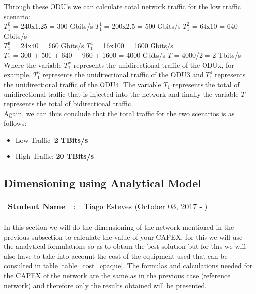 Through these ODU's we can calculate total network traffic for the low traffic scenario:\\

$T_1^0$ = 240x1.25 = 300 Gbits/s \qquad
$T_1^1$ = 200x2.5 = 500 Gbits/s \qquad
$T_1^2$ = 64x10 = 640 Gbits/s \\

$T_1^3$ = 24x40 = 960 Gbits/s \quad
$T_1^4$ = 16x100 = 1600 Gbits/s \\

$T_{1}$ = 300 + 500 + 640 + 960 + 1600 = 4000 Gbits/s \qquad
$T$ = 4000/2 = 2 Tbits/s\\

Where the variable $T_1^x$ represents the unidirectional traffic of the ODUx, for example, $T_1^3$ represents the unidirectional traffic of the ODU3 and $T_1^4$ represents the unidirectional traffic of the ODU4. The variable $T_{1}$ represents the total of unidirectional traffic that is injected into the network and finally the variable $T$ represents the total of bidirectional traffic.\\

Again, we can thus conclude that the total traffic for the two scenarios is as follows:
\begin{itemize}
  \item Low Traffic: \textbf{2 TBits/s}
  \item High Traffic: \textbf{20 TBits/s}
\end{itemize}


\subsection{Dimensioning using Analytical Model}
\begin{tcolorbox}	
\begin{tabular}{p{2.75cm} p{0.2cm} p{10.5cm}} 	
\textbf{Student Name}  &:& Tiago Esteves    (October 03, 2017 - )\\
\end{tabular}
\end{tcolorbox}

In this section we will do the dimensioning of the network mentioned in the previous subsection to calculate the value of your CAPEX, for this we will use the analytical formulations so as to obtain the best solution but for this we will also have to take into account the cost of the equipment used that can be consulted in table \ref{table_cost_opaque}.
The formulas and calculations needed for the CAPEX of the network are the same as in the previous case (reference network) and therefore only the results obtained will be presented.\\

